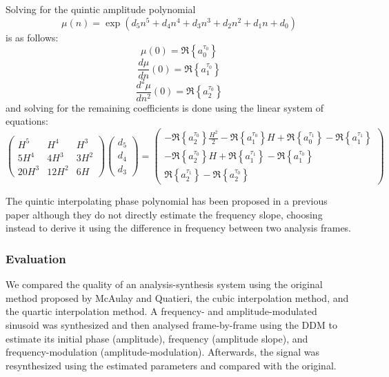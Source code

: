 \documentclass[letterpaper,12pt]{report}
\newcommand\ReNe[1]{\Re \left\{ #1 \right\}}
\begin{document}
Solving for the quintic amplitude polynomial
\begin{equation}
    \label{eq:quinticamppoly}
    \mu(n) = \exp \left(d_5 n^{5} + d_4 n^{4} + d_3 n^{3} + d_2 n^{2} + d_1 n + d_0 \right)
\end{equation}
is as follows:
\[
    \mu(0) = \Re \left\{ a^{\tau_0}_0 \right\}
\]
\[
    \frac{d \mu}{d n}(0) = \Re \left\{ a^{\tau_0}_1 \right\}
\]
\[
    \frac{d^{2} \mu}{d n^{2}}(0) = \Re \left\{ a^{\tau_0}_2 \right\}
\]
and solving for the remaining coefficients is done using the linear system of
equations:
\begin{equation}
    \begin{pmatrix}
        H^5 & H^4 & H^3 \\
        5 H^4 & 4 H^3 & 3 H^2 \\
        20 H^3 & 12 H^2 & 6 H
    \end{pmatrix}
    \begin{pmatrix}
        d_5 \\
        d_4 \\
        d_3
    \end{pmatrix}
    =
    \begin{pmatrix}
        -\ReNe{ a^{\tau_0}_2 } \frac{ H^{2} }{2} - \ReNe{ a^{\tau_0}_1 } H +
            \ReNe{ a^{\tau_1}_0 } - \ReNe{ a^{\tau_1}_1 } \\
        -\ReNe{ a^{\tau_0}_2 } H + \ReNe{ a^{\tau_1}_1 } - \ReNe{ a^{\tau_0}_1 } \\
        \ReNe{ a^{\tau_1}_2 } - \ReNe{ a^{\tau_0}_2 }
    \end{pmatrix}
\end{equation}

The quintic interpolating phase polynomial has been proposed in a previous paper
\cite{girin2003comparing} although they do not directly estimate the frequency
slope, choosing instead to derive it using the difference in frequency between
two analysis frames.

\subsubsection{Evaluation}

We compared the quality of an analysis-synthesis system using the
original method proposed by McAulay and Quatieri, the cubic interpolation
method, and the quartic interpolation method. A frequency- and
amplitude-modulated sinusoid was synthesized and then analysed frame-by-frame
using the DDM to estimate its initial phase (amplitude), frequency (amplitude
slope), and frequency-modulation (amplitude-modulation). Afterwards, the signal
was resynthesized using the estimated parameters and compared with the original.
\end{document}
